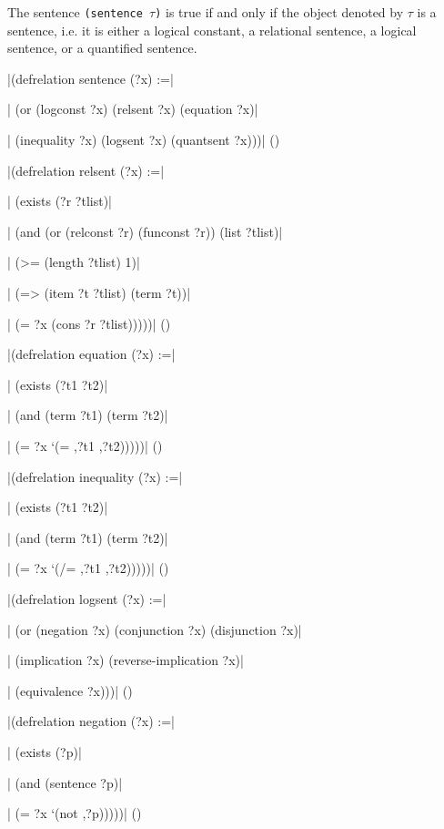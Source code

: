 
The sentence {\tt (sentence $\tau$)} is true if and only if the
object denoted by $\tau$ is a sentence, i.e. it is either a logical
constant, a relational sentence, a logical sentence, or a quantified
sentence.

\medskip
\verbatim|(defrelation sentence (?x) :=|\par
\verbatim|  (or (logconst ?x) (relsent ?x) (equation ?x)|\par
\verbatim|      (inequality ?x) (logsent ?x) (quantsent ?x)))|
\hfill(\equation)\par
\medskip

\medskip
\verbatim|(defrelation relsent (?x) :=|\par
\verbatim|  (exists (?r ?tlist)|\par
\verbatim|    (and (or (relconst ?r) (funconst ?r)) (list ?tlist)|\par
\verbatim|         (>= (length ?tlist) 1)|\par
\verbatim|         (=> (item ?t ?tlist) (term ?t))|\par
\verbatim|         (= ?x (cons ?r ?tlist)))))|
\hfill(\equation)\par
\medskip

\medskip
\verbatim|(defrelation equation (?x) :=|\par
\verbatim|  (exists (?t1 ?t2)|\par
\verbatim|    (and (term ?t1) (term ?t2)|\par
\verbatim|         (= ?x `(= ,?t1 ,?t2)))))|
\hfill(\equation)\par
\medskip

\medskip
\verbatim|(defrelation inequality (?x) :=|\par
\verbatim|  (exists (?t1 ?t2)|\par
\verbatim|    (and (term ?t1) (term ?t2)|\par
\verbatim|         (= ?x `(/= ,?t1 ,?t2)))))|
\hfill(\equation)\par
\medskip

\medskip
\verbatim|(defrelation logsent (?x) :=|\par
\verbatim|  (or (negation ?x) (conjunction ?x) (disjunction ?x)|\par
\verbatim|      (implication ?x) (reverse-implication ?x)|\par
\verbatim|      (equivalence ?x)))|
\hfill(\equation)\par
\medskip

\medskip
\verbatim|(defrelation negation (?x) :=|\par
\verbatim|  (exists (?p)|\par
\verbatim|    (and (sentence ?p)|\par
\verbatim|         (= ?x `(not ,?p)))))|
\hfill(\equation)\par
\medskip

